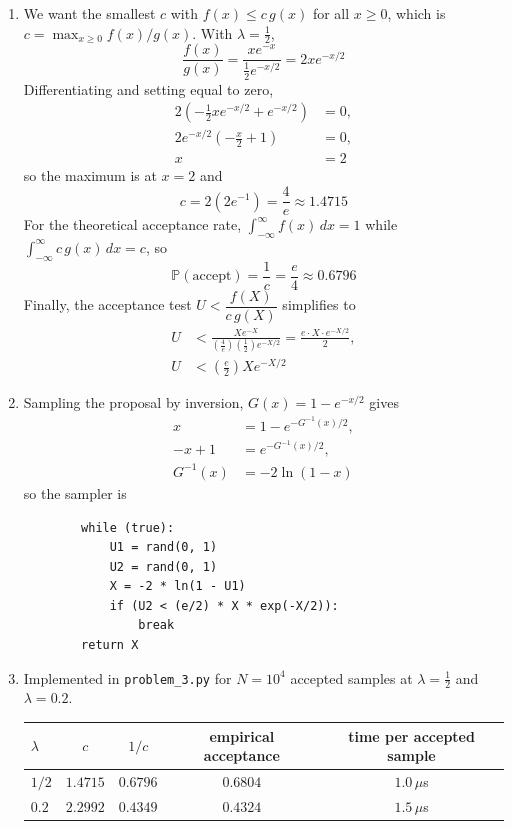 \documentclass[11pt]{article}
\begin{document}
\begin{enumerate}[label=(\alph*)]
    \item
    We want the smallest $c$ with $f(x) \le c\,g(x)$ for all $x \ge 0$, which is
    $c = \max_{x \ge 0} f(x)/g(x)$. With $\lambda = \frac{1}{2}$,
    \[
        \frac{f(x)}{g(x)} = \frac{x e^{-x}}{\frac{1}{2}e^{-x/2}} = 2x e^{-x/2}
    \]
    Differentiating and setting equal to zero,
    \begin{align*}
        2\left(-\frac{1}{2} x e^{-x/2} + e^{-x/2}\right) &= 0, \\
        2e^{-x/2}\left(-\frac{x}{2} + 1\right) &= 0, \\
        x &= 2
    \end{align*}
    so the maximum is at $x = 2$ and
    \[
        c = 2\left(2e^{-1}\right) = \frac{4}{e} \approx \num{1.4715}
    \]
    For the theoretical acceptance rate, $\int_{-\infty}^{\infty} f(x) \, dx = 1$ while
    $\int_{-\infty}^{\infty} c\,g(x) \, dx = c$, so
    \[
        \mathbb{P}(\text{accept}) = \frac{1}{c} = \frac{e}{4} \approx \num{0.6796}
    \]
    Finally, the acceptance test $U < \dfrac{f(X)}{c\,g(X)}$ simplifies to
    \begin{align*}
        U &< \frac{X e^{-X}}{\left(\frac{4}{e}\right)\left(\frac{1}{2}\right)e^{-X/2}}
           = \frac{e \cdot X \cdot e^{-X/2}}{2}, \\
        U &< \left(\frac{e}{2}\right) X e^{-X/2}
    \end{align*}

    \item
    Sampling the proposal by inversion, $G(x) = 1 - e^{-x/2}$ gives
    \begin{align*}
        x &= 1 - e^{-G^{-1}(x)/2}, \\
        -x + 1 &= e^{-G^{-1}(x)/2}, \\
        G^{-1}(x) &= -2\ln(1-x)
    \end{align*}
    so the sampler is
    \begin{verbatim}
        while (true):
            U1 = rand(0, 1)
            U2 = rand(0, 1)
            X = -2 * ln(1 - U1)
            if (U2 < (e/2) * X * exp(-X/2)):
                break
        return X
    \end{verbatim}

    \item
    Implemented in \texttt{problem\_3.py} for $N = 10^4$ accepted samples at
    $\lambda = \frac{1}{2}$ and $\lambda = 0.2$.

    \begin{table}[ht]
        \centering
        \begin{tabular}{lcccc}
            \toprule
            $\lambda$ & $c$ & $1/c$ & empirical acceptance & time per accepted sample \\
            \midrule
            $1/2$ & $\num{1.4715}$ & $\num{0.6796}$ & $\num{0.6804}$ & $1.0\,\mu$s \\
            $0.2$ & $\num{2.2992}$ & $\num{0.4349}$ & $\num{0.4324}$ & $1.5\,\mu$s \\
            \bottomrule
        \end{tabular}
    \end{table}


\end{enumerate}
\end{document}
